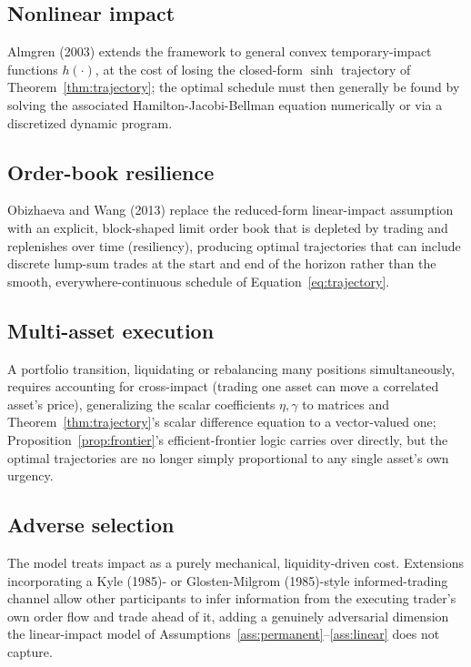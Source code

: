 \documentclass[11pt]{article}
\theoremstyle{remark}
\theoremstyle{definition}
\begin{document}
\subsection{Nonlinear impact}
Almgren (2003) extends the framework to general convex temporary-impact functions $h(\cdot)$, at the cost of losing the closed-form $\sinh$ trajectory of Theorem~\ref{thm:trajectory}; the optimal schedule must then generally be found by solving the associated Hamilton-Jacobi-Bellman equation numerically or via a discretized dynamic program.

\subsection{Order-book resilience}
Obizhaeva and Wang (2013) replace the reduced-form linear-impact assumption with an explicit, block-shaped limit order book that is depleted by trading and replenishes over time (resiliency), producing optimal trajectories that can include discrete lump-sum trades at the start and end of the horizon rather than the smooth, everywhere-continuous schedule of Equation~\eqref{eq:trajectory}.

\subsection{Multi-asset execution}
A portfolio transition, liquidating or rebalancing many positions simultaneously, requires accounting for cross-impact (trading one asset can move a correlated asset's price), generalizing the scalar coefficients $\eta,\gamma$ to matrices and Theorem~\ref{thm:trajectory}'s scalar difference equation to a vector-valued one; Proposition~\ref{prop:frontier}'s efficient-frontier logic carries over directly, but the optimal trajectories are no longer simply proportional to any single asset's own urgency.

\subsection{Adverse selection}
The model treats impact as a purely mechanical, liquidity-driven cost. Extensions incorporating a Kyle (1985)- or Glosten-Milgrom (1985)-style informed-trading channel allow other participants to infer information from the executing trader's own order flow and trade ahead of it, adding a genuinely adversarial dimension the linear-impact model of Assumptions~\ref{ass:permanent}--\ref{ass:linear} does not capture.
\end{document}
